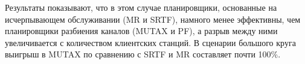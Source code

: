 Результаты показывают, что в этом случае планировщики, основанные на исчерпывающем обслуживании (MR и SRTF), намного менее эффективны, чем планировщики разбиения каналов (MUTAX и PF), а разрыв между ними увеличивается с количеством клиентских станций.
В сценарии большого круга выигрыш в MUTAX по сравнению с SRTF и MR составляет почти 100\%.

